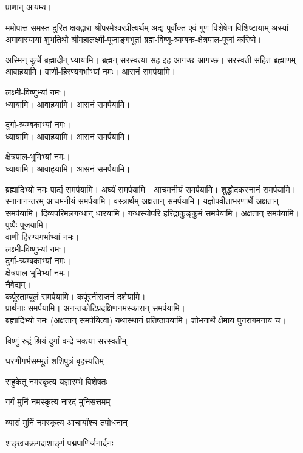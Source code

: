 

प्राणान् आयम्य। 

ममोपात्त-समस्त-दुरित-क्षयद्वारा श्रीपरमेश्वरप्रीत्यर्थम् अद्य-पूर्वोक्त एवं गुण-विशेषेण विशिष्टायाम् अस्यां
अमावास्यायां शुभतिथौ श्रीमहालक्ष्मी-पूजाङ्गभूतां ब्रह्म-विष्णु-त्र्यम्बक-क्षेत्रपाल-पूजां करिष्ये।

अस्मिन् कूर्चे ब्रह्मादीन् ध्यायामि। ब्रह्मन् सरस्वत्या सह इह आगच्छ आगच्छ। सरस्वती-सहित-ब्रह्माणम् आवाहयामि। वाणी-हिरण्यगर्भाभ्यां नमः। आसनं समर्पयामि।

लक्ष्मी-विष्णुभ्यां नमः।\\
ध्यायामि। आवाहयामि। आसनं समर्पयामि।

दुर्गा-त्र्यम्बकाभ्यां नमः।\\
ध्यायामि। आवाहयामि। आसनं समर्पयामि।

क्षेत्रपाल-भूमिभ्यां नमः।\\
ध्यायामि। आवाहयामि। आसनं समर्पयामि।

ब्रह्मादिभ्यो नमः पाद्यं समर्पयामि। अर्घ्यं समर्पयामि।
आचमनीयं समर्पयामि। शुद्धोदकस्नानं समर्पयामि।\\
स्नानानन्तरम् आचमनीयं समर्पयामि।
वस्त्रार्थम् अक्षतान् समर्पयामि।
यज्ञोपवीताभरणार्थे अक्षतान् समर्पयामि।
दिव्यपरिमलगन्धान् धारयामि।
गन्धस्योपरि हरिद्राकुङ्कुमं समर्पयामि। अक्षतान् समर्पयामि। \\
पुष्पैः पूजयामि।\\

वाणी-हिरण्यगर्भाभ्यां नमः।\\
लक्ष्मी-विष्णुभ्यां नमः।\\
दुर्गा-त्र्यम्बकाभ्यां नमः।\\
क्षेत्रपाल-भूमिभ्यां नमः।\\

नैवेद्यम्। \\
कर्पूरताम्बूलं समर्पयामि। कर्पूरनीराजनं दर्शयामि।\\
प्रार्थनाः समर्पयामि।
अनन्तकोटिप्रदक्षिणनमस्कारान् समर्पयामि।\\

ब्रह्मादिभ्यो नमः (अक्षतान् समर्पयित्वा) यथास्थानं प्रतिष्ठापयामि। शोभनार्थे क्षेमाय पुनरागमनाय च।


{विष्णुं रुद्रं श्रियं दुर्गां वन्दे भक्त्या सरस्वतीम्}

{धरणीगर्भसम्भूतं शशिपुत्रं बृहस्पतिम्}

{राहुकेतू नमस्कृत्य यज्ञारम्भे विशेषतः}

{गर्गं मुनिं नमस्कृत्य नारदं मुनिसत्तमम्}

{व्यासं मुनिं नमस्कृत्य आचार्यांश्च तपोधनान्}

{शङ्खचक्रगदाशार्ङ्ग-पद्मपाणिर्जनार्दनः}
